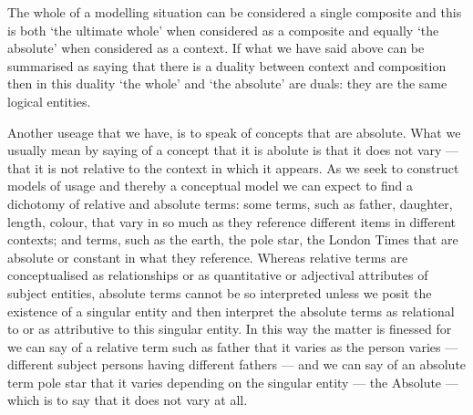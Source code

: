 \mynote The whole of a modelling situation can be considered a single composite and this is both ‘the ultimate whole’ when considered as a composite and equally ‘the absolute’ when considered as a context. If what we have said above can be summarised as saying that there is a duality between context and composition then in this duality ‘the whole’ and ‘the absolute’ are duals: they are the same logical entities.

\mynote Another useage that we have, is to speak of concepts that are absolute. What we usually mean by saying of a concept that it is abolute is that it does not vary — that it is not relative to the context in which it appears. As we seek to construct models of usage and thereby a conceptual model we can expect to find a dichotomy of relative and absolute terms: some terms, such as father, daughter, length, colour, that vary in so much as they reference different items in different contexts; and terms, such as the earth, the pole star, the London Times that are absolute or constant in what they reference. Whereas relative terms are conceptualised as relationships or as quantitative or adjectival attributes of subject entities, absolute terms cannot be so interpreted unless we posit the existence of a singular entity and then interpret the absolute terms as relational to or as attributive to this singular entity. In this way the matter is finessed for we can say of a relative term such as father that it varies as the person varies — different subject persons having different fathers — and we can say of an absolute term pole star that it varies depending on the singular entity — the Absolute — which is to say that it does not vary at all.
